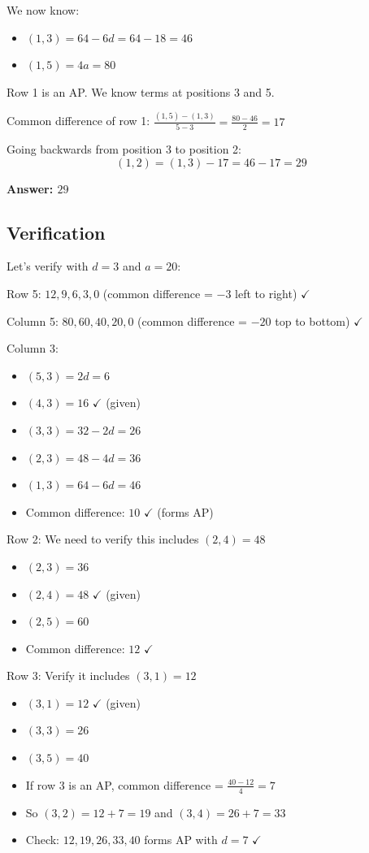 \documentclass[12pt]{article}
\begin{document}
We now know:
\begin{itemize}
    \item $(1,3) = 64 - 6d = 64 - 18 = 46$
    \item $(1,5) = 4a = 80$
\end{itemize}

Row 1 is an AP. We know terms at positions 3 and 5.

Common difference of row 1: $\frac{(1,5) - (1,3)}{5 - 3} = \frac{80 - 46}{2} = 17$

Going backwards from position 3 to position 2:
\[(1,2) = (1,3) - 17 = 46 - 17 = 29\]

\textbf{Answer: $\boxed{29}$}

\subsection*{Verification}

Let's verify with $d = 3$ and $a = 20$:

Row 5: $12, 9, 6, 3, 0$ (common difference = $-3$ left to right) $\checkmark$

Column 5: $80, 60, 40, 20, 0$ (common difference = $-20$ top to bottom) $\checkmark$

Column 3:
\begin{itemize}
    \item $(5,3) = 2d = 6$
    \item $(4,3) = 16$ $\checkmark$ (given)
    \item $(3,3) = 32 - 2d = 26$
    \item $(2,3) = 48 - 4d = 36$
    \item $(1,3) = 64 - 6d = 46$
    \item Common difference: $10$ $\checkmark$ (forms AP)
\end{itemize}

Row 2: We need to verify this includes $(2,4) = 48$
\begin{itemize}
    \item $(2,3) = 36$
    \item $(2,4) = 48$ $\checkmark$ (given)
    \item $(2,5) = 60$
    \item Common difference: $12$ $\checkmark$
\end{itemize}

Row 3: Verify it includes $(3,1) = 12$
\begin{itemize}
    \item $(3,1) = 12$ $\checkmark$ (given)
    \item $(3,3) = 26$
    \item $(3,5) = 40$
    \item If row 3 is an AP, common difference = $\frac{40 - 12}{4} = 7$
    \item So $(3,2) = 12 + 7 = 19$ and $(3,4) = 26 + 7 = 33$
    \item Check: $12, 19, 26, 33, 40$ forms AP with $d = 7$ $\checkmark$
\end{itemize}
\end{document}
